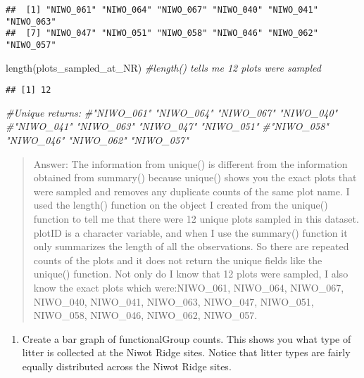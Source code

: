\documentclass[
]{article}
\newenvironment{Shaded}{\begin{snugshade}}{\end{snugshade}}
\newcommand{\CommentTok}[1]{\textcolor[rgb]{0.56,0.35,0.01}{\textit{#1}}}
\newcommand{\FunctionTok}[1]{\textcolor[rgb]{0.00,0.00,0.00}{#1}}
\newcommand{\NormalTok}[1]{#1}
\providecommand{\tightlist}{%
  \setlength{\itemsep}{0pt}\setlength{\parskip}{0pt}}
\begin{document}
\begin{verbatim}
##  [1] "NIWO_061" "NIWO_064" "NIWO_067" "NIWO_040" "NIWO_041" "NIWO_063"
##  [7] "NIWO_047" "NIWO_051" "NIWO_058" "NIWO_046" "NIWO_062" "NIWO_057"
\end{verbatim}

\begin{Shaded}
\begin{Highlighting}[]
\FunctionTok{length}\NormalTok{(plots\_sampled\_at\_NR) }\CommentTok{\#length() tells me 12 plots were sampled}
\end{Highlighting}
\end{Shaded}

\begin{verbatim}
## [1] 12
\end{verbatim}

\begin{Shaded}
\begin{Highlighting}[]
\CommentTok{\#Unique returns:}
\CommentTok{\#"NIWO\_061" "NIWO\_064" "NIWO\_067" "NIWO\_040" }
\CommentTok{\#"NIWO\_041" "NIWO\_063" "NIWO\_047" "NIWO\_051" }
\CommentTok{\#"NIWO\_058" "NIWO\_046" "NIWO\_062" "NIWO\_057"}
\end{Highlighting}
\end{Shaded}

\begin{quote}
Answer: The information from unique() is different from the information
obtained from summary() because unique() shows you the exact plots that
were sampled and removes any duplicate counts of the same plot name. I
used the length() function on the object I created from the unique()
function to tell me that there were 12 unique plots sampled in this
dataset. plotID is a character variable, and when I use the summary()
function it only summarizes the length of all the observations. So there
are repeated counts of the plots and it does not return the unique
fields like the unique() function. Not only do I know that 12 plots were
sampled, I also know the exact plots which were:NIWO\_061, NIWO\_064,
NIWO\_067, NIWO\_040, NIWO\_041, NIWO\_063, NIWO\_047, NIWO\_051,
NIWO\_058, NIWO\_046, NIWO\_062, NIWO\_057.
\end{quote}

\begin{enumerate}
\def\labelenumi{\arabic{enumi}.}
\setcounter{enumi}{13}
\tightlist
\item
  Create a bar graph of functionalGroup counts. This shows you what type
  of litter is collected at the Niwot Ridge sites. Notice that litter
  types are fairly equally distributed across the Niwot Ridge sites.
\end{enumerate}
\end{document}
